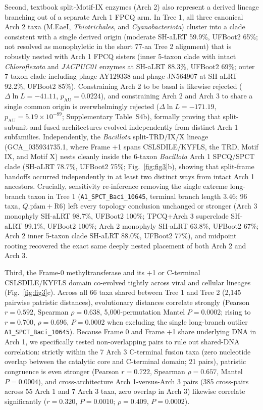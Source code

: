 \documentclass[10pt,letterpaper]{article}
\newcommand{\spname}[1]{\textit{#1}}
\begin{document}
Second, textbook split-Motif-IX enzymes (Arch 2) also represent a derived lineage branching out of a separate Arch 1 FPCQ arm. In Tree 1, all three canonical Arch 2 taxa (M.EaeI, \spname{Thiotrichales}, and \spname{Cyanobacteriota}) cluster into a clade consistent with a single derived origin (moderate SH-aLRT 59.9\%, UFBoot2 65\%; not resolved as monophyletic in the short 77-aa Tree 2 alignment) that is robustly nested with Arch 1 FPCQ sisters (inner 5-taxon clade with intact \spname{Chloroflexota} and \spname{JACPUC01} enzymes at SH-aLRT 88.3\%, UFBoot2 69\%; outer 7-taxon clade including phage AY129338 and phage JN564907 at SH-aLRT 92.2\%, UFBoot2 85\%). Constraining Arch 2 to be basal is likewise rejected ($\Delta\ln L = -41.11$, $p_{\mathrm{AU}} = 0.0224$), and constraining Arch 2 and Arch 3 to share a single common origin is overwhelmingly rejected ($\Delta\ln L = -171.19$, $p_{\mathrm{AU}} = 5.19 \times 10^{-89}$; Supplementary Table~S4b), formally proving that split-subunit and fused architectures evolved independently from distinct Arch 1 subfamilies. Independently, the \spname{Bacillota} split-TRD/IX/X lineage (GCA\_035934735.1, where Frame +1 spans CSLSDILE/KYFLS, the TRD, Motif IX, and Motif X) nests cleanly inside the 6-taxon \spname{Bacillota} Arch 1 SPCQ/SPCT clade (SH-aLRT 78.7\%, UFBoot2 75\%; Fig.~\ref{fig:fig3}b), showing that split-frame handoffs occurred independently in at least two distinct ways from intact Arch 1 ancestors. Crucially, sensitivity re-inference removing the single extreme long-branch taxon in Tree 1 (\texttt{A1\_SPCT\_Baci\_10645}, terminal branch length 3.46; 96 taxa, $Q.\text{pfam}+\text{R6}$) left every topology conclusion unchanged or stronger (Arch 3 monophyly SH-aLRT 98.7\%, UFBoot2 100\%; TPCQ+Arch 3 superclade SH-aLRT 99.1\%, UFBoot2 100\%; Arch 2 monophyly SH-aLRT 63.8\%, UFBoot2 67\%; Arch 2 inner 5-taxon clade SH-aLRT 88.0\%, UFBoot2 77\%), and midpoint rooting recovered the exact same deeply nested placement of both Arch 2 and Arch 3.

Third, the Frame-0 methyltransferase and its +1 or C-terminal CSLSDILE/KYFLS domain co-evolved tightly across viral and cellular lineages (Fig.~\ref{fig:fig3}c). Across all 66 taxa shared between Tree 1 and Tree 2 (2,145 pairwise patristic distances), evolutionary distances correlate strongly (Pearson $r = 0.592$, Spearman $\rho = 0.638$, 5,000-permutation Mantel $P = 0.0002$; rising to $r = 0.700$, $\rho = 0.696$, $P = 0.0002$ when excluding the single long-branch outlier \texttt{A1\_SPCT\_Baci\_10645}). Because Frame 0 and Frame +1 share underlying DNA in Arch 1, we specifically tested non-overlapping pairs to rule out shared-DNA correlation: strictly within the 7 Arch 3 C-terminal fusion taxa (zero nucleotide overlap between the catalytic core and C-terminal domain; 21 pairs), patristic congruence is even stronger (Pearson $r = 0.722$, Spearman $\rho = 0.657$, Mantel $P = 0.0004$), and cross-architecture Arch 1-versus-Arch 3 pairs (385 cross-pairs across 55 Arch 1 and 7 Arch 3 taxa, zero overlap in Arch 3) likewise correlate significantly ($r = 0.320$, $P = 0.0010$; $\rho = 0.409$, $P = 0.0002$).
\end{document}
